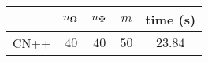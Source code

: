 \centering
\renewcommand{\arraystretch}{1.2}
\begin{tabular}{@{}lcccc@{}}
\toprule
 & $n_{\boldsymbol{\Omega}}$ & $n_{\boldsymbol{\Psi}}$ & $m$ & time (s)\\
\midrule
CN++ & $40$ & $40$ & $50$ & $23.84$ \\
\bottomrule
\end{tabular}
